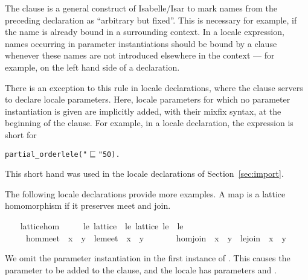 \begin{isabellebody}
\begin{isamarkuptext}
  The  clause is a
  general construct of Isabelle/Isar to mark names from the preceding
  declaration as ``arbitrary but fixed''.  This is necessary for
  example, if the name is already bound in a surrounding context.  In
  a locale expression, names occurring in parameter instantiations
  should be bound by a  clause whenever these names
  are not introduced elsewhere in the context --- for example, on the
  left hand side of a  declaration.

  There is an exception to this rule in locale declarations, where the
   clause servers to declare locale parameters.  Here,
  locale parameters for which no parameter instantiation is given are
  implicitly added, with their mixfix syntax, at the beginning of the
   clause.  For example, in a locale declaration, the
  expression  is short for
\begin{alltt}
  partial_order le  le ( "\(\sqsubseteq\)" 50)\textrm{.}
\end{alltt}
  This short hand was used in the locale declarations of
  Section~\ref{sec:import}.%
\end{isamarkuptext}%
\isamarkuptrue%
%
\begin{isamarkuptext}%
The following locale declarations provide more examples.  A map
  \isa{{\isasymphi}} is a lattice homomorphism if it preserves meet and
  join.%
\end{isamarkuptext}%
\isamarkuptrue%
\ \ \isamarkupfalse%
\ lattice{\isacharunderscore}hom\ {\isacharequal}\isanewline
\ \ \ \ le{\isacharcolon}\ lattice\ {\isacharplus}\ le{\isacharprime}{\isacharcolon}\ lattice\ le{\isacharprime}\ \ le{\isacharprime}\ {\isacharparenleft}\ {\isachardoublequoteopen}{\isasympreceq}{\isachardoublequoteclose}\ {}{}{\isacharparenright}\ {\isacharplus}\isanewline
\ \ \ \ \ {\isasymphi}\isanewline
\ \ \ \ \ hom{\isacharunderscore}meet{\isacharcolon}\ {\isachardoublequoteopen}{\isasymphi}\ {\isacharparenleft}x\ {\isasymsqinter}\ y{\isacharparenright}\ {\isacharequal}\ le{\isacharprime}{\isachardot}meet\ {\isacharparenleft}{\isasymphi}\ x{\isacharparenright}\ {\isacharparenleft}{\isasymphi}\ y{\isacharparenright}{\isachardoublequoteclose}\isanewline
\ \ \ \ \ \ \ hom{\isacharunderscore}join{\isacharcolon}\ {\isachardoublequoteopen}{\isasymphi}\ {\isacharparenleft}x\ {\isasymsqunion}\ y{\isacharparenright}\ {\isacharequal}\ le{\isacharprime}{\isachardot}join\ {\isacharparenleft}{\isasymphi}\ x{\isacharparenright}\ {\isacharparenleft}{\isasymphi}\ y{\isacharparenright}{\isachardoublequoteclose}%
\begin{isamarkuptext}%
We omit the parameter instantiation in the first instance of
  .  This causes the parameter  to be added
  to the  clause, and the locale has parameters
   and .


\end{isamarkuptext}
\end{isabellebody}
